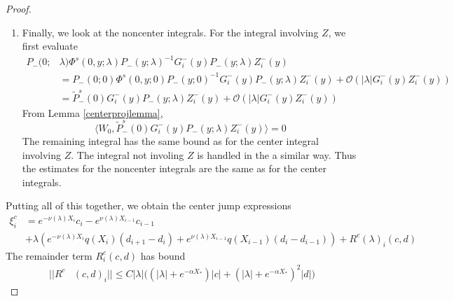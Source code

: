 \documentclass[thesis.tex]{subfiles}
\begin{document}
\begin{lemma}
\begin{proof}
\begin{enumerate}
\item Finally, we look at the noncenter integrals. For the integral involving $Z$, we first evaluate 
\begin{align*}
P_-(0; &\lambda) \Phi^s(0, y; \lambda) P_-(y; \lambda)^{-1} G_i^-(y) P_-(y; \lambda)Z_i^-(y) \\
&= P_-(0; 0) \Phi^s(0, y; 0) P_-(y; 0)^{-1}G_i^-(y) P_-(y; \lambda)Z_i^-(y) + \mathcal{O}(|\lambda| G_i^-(y) Z_i^-(y)) \\
&= \tilde{P}_-^s(0)G_i^-(y) P_-(y; \lambda)Z_i^-(y) + \mathcal{O}(|\lambda| G_i^-(y) Z_i^-(y))
\end{align*}
From Lemma \ref{centerprojlemma},
\[
\langle W_0, \tilde{P}_-^s(0)G_i^-(y) P_-(y; \lambda)Z_i^-(y) \rangle = 0
\]
The remaining integral has the same bound as for the center integral involving $Z$. The integral not involing $Z$ is handled in the a similar way. Thus the estimates for the noncenter integrals are the same as for the center integrals.
\end{enumerate}

Putting all of this together, we obtain the center jump expressions
\begin{align*}
\xi^c_i &= e^{-\nu(\lambda) X_i} c_i - e^{\nu(\lambda) X_{i-1}} c_{i-1} \\
&+ \lambda \left( e^{-\nu(\lambda)X_i} q(X_i) (d_{i+1} - d_i ) + e^{\nu(\lambda)X_{i-1}} q(X_{i-1}) (d_i - d_{i-1} )\right) + R^c(\lambda)_i(c, d)
\end{align*}
The remainder term $R^c_i(c, d)$ has bound
\begin{equation}\label{centerR}
\begin{aligned}
||R^c&(c, d)_i|| \leq C |\lambda| \Big( (|\lambda| + e^{-\alpha X_*})|c| + (|\lambda| + e^{-\alpha X_*})^2 |d| \Big)
\end{aligned}
\end{equation}


\end{proof}
\end{lemma}
\end{document}
